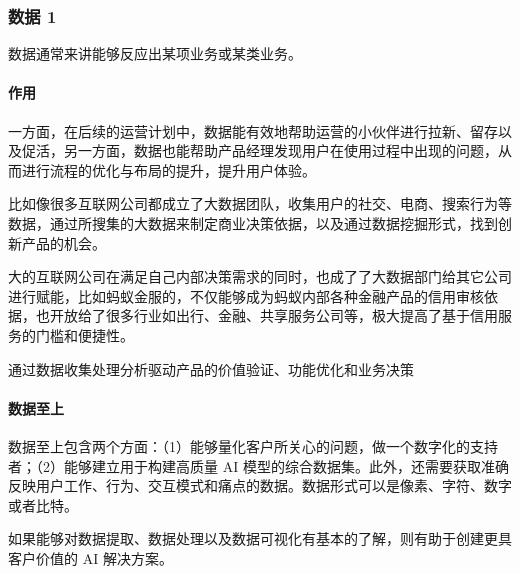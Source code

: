 \documentclass[letterpaper,11pt,english]{sphinxmanual}
\begin{document}
\subsubsection{数据 1\sphinxfootnotemark[308]}
\label{\detokenize{chapter_idea/data:id1}}\label{\detokenize{chapter_idea/data::doc}}%
\begin{footnotetext}[308]\sphinxAtStartFootnote
{}
%
\end{footnotetext}\ignorespaces 
数据通常来讲能够反应出某项业务或某类业务。


\paragraph{作用}
\label{\detokenize{chapter_idea/data:id2}}
一方面，在后续的运营计划中，数据能有效地帮助运营的小伙伴进行拉新、留存以及促活，另一方面，数据也能帮助产品经理发现用户在使用过程中出现的问题，从而进行流程的优化与布局的提升，提升用户体验。%
\begin{footnote}[309]\sphinxAtStartFootnote
{}
%
\end{footnote}

比如像很多互联网公司都成立了大数据团队，收集用户的社交、电商、搜索行为等数据，通过所搜集的大数据来制定商业决策依据，以及通过数据挖掘形式，找到创新产品的机会。

大的互联网公司在满足自己内部决策需求的同时，也成了了大数据部门给其它公司进行赋能，比如蚂蚁金服的，不仅能够成为蚂蚁内部各种金融产品的信用审核依据，也开放给了很多行业如出行、金融、共享服务公司等，极大提高了基于信用服务的门槛和便捷性。

通过数据收集处理分析驱动产品的价值验证、功能优化和业务决策


\paragraph{数据至上}
\label{\detokenize{chapter_idea/data:id3}}
数据至上包含两个方面：（1）能够量化客户所关心的问题，做一个数字化的支持者；（2）能够建立用于构建高质量
AI
模型的综合数据集。此外，还需要获取准确反映用户工作、行为、交互模式和痛点的数据。数据形式可以是像素、字符、数字或者比特。

如果能够对数据提取、数据处理以及数据可视化有基本的了解，则有助于创建更具客户价值的
AI 解决方案。%
\begin{footnote}[310]\sphinxAtStartFootnote
{}
%
\end{footnote}
\end{document}
